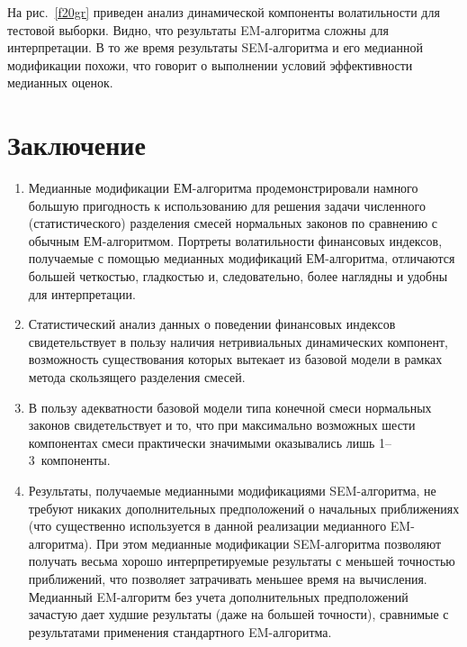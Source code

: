 \begin{multicols}{2}
На рис.~\ref{f20gr} приведен анализ динамической компоненты волатильности для
тестовой выборки. Видно, что результаты EM-алгоритма сложны для
интерпретации. В то же время результаты SEM-ал\-го\-рит\-ма и его
медианной модификации похожи, что говорит о выполнении условий
эффективности медианных оценок.

\section{Заключение}

\begin{enumerate}[1.]
\item Медианные модификации ЕМ-алгоритма продемонстрировали
намного большую пригодность к использованию для решения задачи
чис\-лен\-но\-го (статистического) разделения смесей нормальных законов
по сравнению с обычным ЕМ-алгоритмом. Портреты волатильности
финансовых индексов, получаемые с помощью медианных модификаций
ЕМ-алгоритма, отличаются большей четкостью, гладкостью и,
следовательно, более наглядны и удобны для интерпретации.
\item Статистический анализ данных о поведении финансовых индексов
свидетельствует в пользу наличия нетривиальных динамических
компонент, возможность существования которых вытекает из базовой
модели в рамках метода скользящего разделения смесей.
\item В пользу адекватности базовой модели типа конечной смеси
нормальных законов свидетельствует и то, что при максимально
возможных шести компонентах смеси практически значимыми
оказывались лишь 1--3~компоненты.
\item Результаты, получаемые медианными мо\-ди\-фи\-кациями SEM-алгоритма, не требуют
никаких дополнительных предположений о начальных приближениях (что
существенно используется в данной реализации медианного
EM-ал\-го\-рит\-ма). При этом медианные модификации SEM-ал\-го\-рит\-ма
позволяют получать весьма хорошо интерпретируемые результаты с
меньшей точностью приближений, что позволяет затрачивать меньшее
время на вычисления. Медианный EM-алгоритм без учета
дополнительных предположений зачастую дает худшие результаты (даже
на большей точности), сравнимые с результатами применения
стандартного EM-ал\-го\-рит\-ма.
\end{enumerate}
\vspace*{-12pt}

\pagebreak

{\small\frenchspacing
{%
\begin{thebibliography}{99}


\end{thebibliography}}}
\end{multicols}

